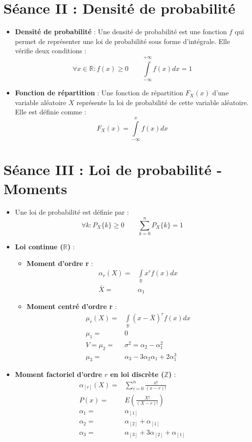 \documentclass[a4paper,11pt]{report}
\begin{document}
\section{Séance II : Densité de probabilité}
\begin{itemize}
	\item \textbf{Densité de probabilité} : Une densité de probabilité est une fonction $f$ qui permet de représenter une loi de probabilité sous forme d'intégrale. Elle vérifie deux conditions :
		\[
			\forall x \in \mathbb{R} : f(x) \ge 0 \quad \quad
			\int\limits_{-\infty}^{+\infty}{f(x)dx}=1
		\]
	\item \textbf{Fonction de répartition} : Une fonction de répartition $F_X(x)$ d'une variable aléatoire $X$ représente la loi de probabilité de cette variable aléatoire. Elle est définie comme :
		\[
			F_X(x)=\int\limits_{-\infty}^{x}{f(x)dx}
		\]
\end{itemize}

\section{Séance III : Loi de probabilité - Moments}
\begin{itemize}
	\item Une loi de probabilité est définie par :
		\[
			\forall k : P_X\{k\} \ge 0 \quad\quad
			\sum\limits_{k=0}^{n}{P_X\{k\}} = 1
		\]
	\item \textbf{Loi continue ($\mathbb{R}$)} :
	\begin{itemize}
		\item \textbf{Moment d'ordre r} :
			\begin{align*}
				\alpha_r(X) =& \int\limits_{\mathbb{R}}{x^rf(x)dx} \\
				\bar{X} =& \alpha_1
			\end{align*}
		\item \textbf{Moment centré d'ordre r} :
			\begin{align*}
				\mu_r(X) =& \int\limits_{\mathbb{R}}{\left(x-\bar{X}\right)^rf(x)dx} \\
				\mu_1 =& 0 \\
				V=\mu_2 =& \sigma^2 = \alpha_2 - \alpha_1^2 \\
				\mu_3 =& \alpha_3 - 3\alpha_2 \alpha_1 + 2\alpha_1^3
			\end{align*}
	\end{itemize}
	\item \textbf{Moment factoriel d'ordre $r$ en loi discrète ($\mathbb{Z}$)} :
		\begin{align*}
			\alpha_{[r]}(X) =& \sum\limits_{i = 0}^{n}{\frac{x!}{(x-r)!}} \\
			P(x) =& E\left(\frac{X!}{(X-r)!}\right) \\
			\alpha_1 =& \alpha_{[1]} \\
			\alpha_2 =& \alpha_{[2]} + \alpha_{[1]} \\
			\alpha_3 =& \alpha_{[3]} + 3\alpha_{[2]} + \alpha_{[1]}
		\end{align*}
\end{itemize}
\end{document}
